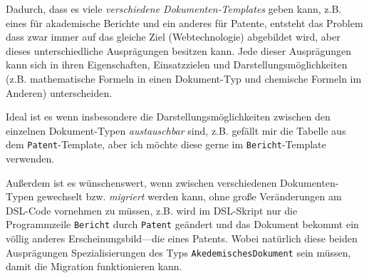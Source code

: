 Dadurch, dass es viele \emph{verschiedene Dokumenten-Templates} geben kann,
z.B. eines für akademische Berichte und ein anderes für Patente, entsteht das
Problem dass zwar immer auf das gleiche Ziel (Webtechnologie) abgebildet
wird, aber dieses unterschiedliche Ausprägungen besitzen kann.
Jede dieser Ausprägungen kann sich in ihren Eigenschaften, Einsatzzielen
und Darstellungsmöglichkeiten (z.B. mathematische Formeln in einen
Dokument-Typ und chemische Formeln im Anderen) unterscheiden.

Ideal ist es wenn insbesondere die Darstellungsmöglichkeiten zwischen
den einzelnen Dokument-Typen \emph{austauschbar} sind, z.B. gefällt mir
die Tabelle aus dem \verb|Patent|-Template, aber ich möchte diese gerne im
\verb|Bericht|-Template verwenden.

Außerdem ist
es wünschenswert, wenn zwischen verschiedenen Dokumenten-Typen gewechselt
bzw. \emph{migriert} werden kann, ohne große Veränderungen am
DSL-Code vornehmen zu müssen, z.B. wird im
DSL-Skript nur die Programmzeile \verb|Bericht| durch \verb|Patent| geändert und
das Dokument bekommt ein völlig anderes Erscheinungsbild---die eines Patents.
Wobei natürlich diese beiden Ausprägungen Spezialisierungen des Typs
\verb|AkedemischesDokument| sein müssen, damit die Migration funktionieren kann.

